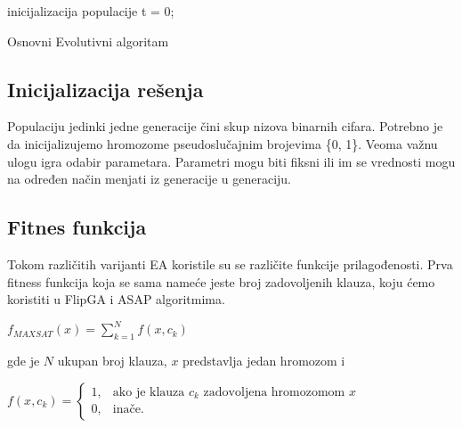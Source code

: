 \documentclass{article}
\begin{document}
\begin{algorithm}[H]
\SetAlgoLined
{}

\BlankLine
 inicijalizacija populacije\;
 t = 0; \\
\caption{Osnovni Evolutivni algoritam}
\end{algorithm}

\subsection{Inicijalizacija rešenja}
\label{sec:ea_init}

Populaciju jedinki jedne generacije čini skup nizova binarnih cifara.
Potrebno je da inicijalizujemo hromozome pseudoslučajnim brojevima \{0, 1\}. Veoma važnu ulogu igra odabir parametara.  Parametri mogu biti fiksni ili im se vrednosti mogu na određen način menjati iz generacije u generaciju.

\subsection{Fitnes funkcija}
\label{sec:ea_fitness}

Tokom različitih varijanti EA koristile su se različite funkcije prilagođenosti. Prva fitness funkcija koja se sama nameće jeste broj zadovoljenih klauza, koju ćemo koristiti u FlipGA i ASAP algoritmima. \\

	\begin{center}
	$ f_{MAXSAT} (x) = \sum_{k=1}^{N} f(x, c_k) $
	\end{center} 
	
gde je $N$ ukupan broj klauza, $x$ predstavlja jedan hromozom i \\

	\begin{center}
	$ f(x, c_k) = \begin{cases} 1, & \mbox{ako je klauza } c_k \mbox{ zadovoljena hromozomom } x \\ 0, & \mbox{inače.} \end{cases} $
	\end{center}
	
\end{document}
